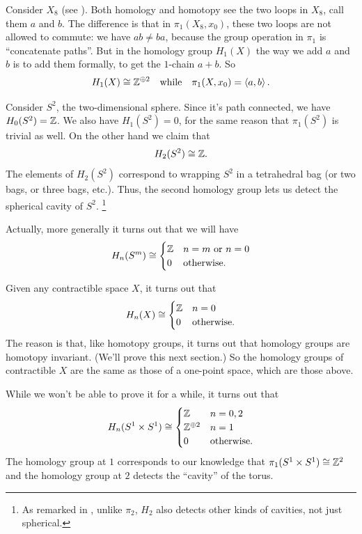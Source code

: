 \begin{example}
	Consider $X_8$ (see ).
	Both homology and homotopy see the two loops in $X_8$, call them $a$ and $b$.
	The difference is that in $\pi_1(X_8, x_0)$,
	these two loops are not allowed to commute: we have $ab \neq ba$,
	because the group operation in $\pi_1$ is ``concatenate paths''.
	But in the homology group $H_1(X)$ the way we add $a$ and $b$
	is to add them formally, to get the $1$-chain $a+b$.
	So \[ H_1(X) \cong \mathbb Z^{\oplus 2} \quad\text{while}\quad \pi_1(X, x_0) = \left< a,b\right>. \]
\end{example}

\begin{example}
	\label{ex:homology_group_sphere}
	Consider $S^2$, the two-dimensional sphere.
	Since it's path connected, we have $H_0(S^2) = \mathbb Z$.
	We also have $H_1(S^2) = 0$, for the same reason that $\pi_1(S^2)$ is trivial as well.
	On the other hand we claim that \[ H_2(S^2) \cong \mathbb Z. \]
	The elements of $H_2(S^2)$ correspond to wrapping $S^2$ in a tetrahedral bag
	(or two bags, or three bags, etc.).
	Thus, the second homology group lets us detect the spherical cavity of $S^2$.%
	\footnote{As remarked in , unlike $\pi_2$,
		$H_2$ also detects other kinds of cavities, not just spherical.}
\end{example}
Actually, more generally it turns out that we will have
\[
	H_n(S^m) \cong
	\begin{cases}
		\mathbb Z & n=m \text{ or } n=0 \\
		0 & \text{otherwise}.
	\end{cases}
\]

\begin{example}
	Given any contractible space $X$, it turns out that
	\[
		H_n(X)
		\cong
		\begin{cases}
			\mathbb Z & n = 0 \\
			0 & \text{otherwise}.
		\end{cases}
	\]
	The reason is that, like homotopy groups, it turns out
	that homology groups are homotopy invariant.
	(We'll prove this next section.)
	So the homology groups of contractible $X$ are the same
	as those of a one-point space, which are those above.
\end{example}

\begin{example}
	While we won't be able to prove it for a while, it turns out that
	\[
		H_n(S^1 \times S^1)
		\cong
		\begin{cases}
			\mathbb Z & n = 0,2 \\
			\mathbb Z^{\oplus 2} & n = 1 \\
			0 & \text{otherwise}.
		\end{cases}
	\]
	The homology group at $1$ corresponds to our knowledge that $\pi_1(S^1 \times S^1) \cong \mathbb Z^2$
	and the homology group at $2$ detects the ``cavity'' of the torus.
\end{example}


